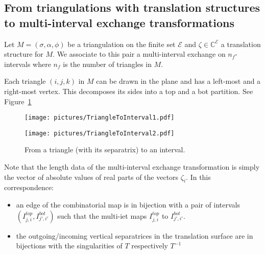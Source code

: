 \documentclass{article}
\def\CC{\mathbb{C}}
\def\cE{\mathcal{E}}
\begin{document}
\subsection{From triangulations with translation structures to multi-interval exchange transformations}
Let $M = (\sigma, \alpha, \phi)$ be a triangulation on
the finite set $\cE$ and $\zeta \in \CC^\cE$ a translation structure for $M$.
We associate to this pair a multi-interval exchange on
$n_f$-intervals where $n_f$ is the number of triangles in $M$.

Each triangle $(i,j,k)$ in $M$ can be drawn in the plane and has a left-most and
a right-most vertex. This decomposes its sides into a top and a bot partition.
See Figure~\ref{fig:FromTrianglesToIntervals}
\begin{figure}[!ht]
\begin{minipage}{0.4\textwidth}
\begin{center}
\texttt{[image: pictures/TriangleToInterval1.pdf]}
\end{center}
\end{minipage}
\hspace{.1\textwidth}
\begin{minipage}{0.4\textwidth}
\begin{center}
\texttt{[image: pictures/TriangleToInterval2.pdf]}
\end{center}
\end{minipage}
\caption{From a triangle (with its separatrix) to an interval.}
\label{fig:FromTrianglesToIntervals}
\end{figure}

Note that the length data of the multi-interval exchange transformation is
simply the vector of absolute values of real parts of the vectors $\zeta_i$.
In this correspondence:
\begin{itemize}
\item an edge of the combinatorial map is in bijection with a pair of intervals
$(I^{top}_{j,i}, I^{bot}_{j',i'})$ such that the multi-iet maps $I^{top}_{j,i}$
to $I^{bot}_{j',i'}$.
\item the outgoing/incoming vertical separatrices in the translation surface are
in bijections with the singularities of $T$ respectively $T^{-1}$
\end{itemize}
\end{document}
